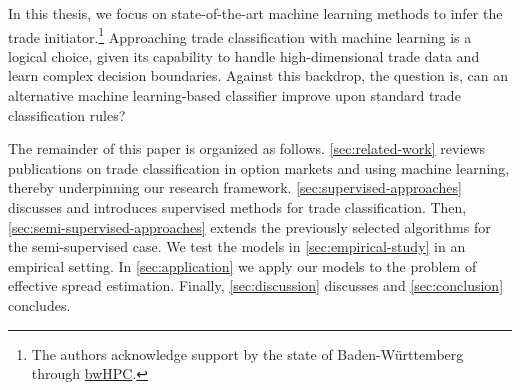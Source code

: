 In this thesis, we focus on state-of-the-art machine learning methods to infer the trade initiator.\footnote{The authors acknowledge support by the state of Baden-Württemberg through \href{https://www.bwhpc.de/}{bwHPC}.} Approaching trade classification with machine learning is a logical choice, given its capability to handle high-dimensional trade data and learn complex decision boundaries. Against this backdrop, the question is, can an alternative machine learning-based classifier improve upon standard trade classification rules?

The remainder of this paper is organized as follows. \cref{sec:related-work} reviews publications on trade classification in option markets and using machine learning, thereby underpinning our research framework. \cref{sec:supervised-approaches} discusses and introduces supervised methods for trade classification. Then, \cref{sec:semi-supervised-approaches} extends the previously selected algorithms for the semi-supervised case. We test the models in \cref{sec:empirical-study} in an empirical setting. In \cref{sec:application} we apply our models to the problem of effective spread estimation. Finally, \cref{sec:discussion} discusses and \cref{sec:conclusion} concludes.
